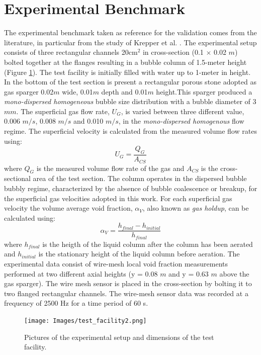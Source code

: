 \documentclass[11pt,a4paper]{article}
\begin{document}
\section{Experimental Benchmark}
\label{sec:expbench}
The  experimental benchmark taken as reference for the validation comes from the literature, in particular from the study of Krepper et al. \cite{krepper}. The experimental setup consists of three rectangular channels 20cm$^2$ in cross-section (0.1 $\times$ 0.02 $m$) bolted together at the flanges resulting in a bubble column of 1.5-meter height (Figure \ref{fig:facility}). The test facility is initially filled with water up to 1-meter in height. In the bottom of the test section is present a rectangular porous stone adopted as gas sparger 0.02$m$ wide, 0.01$m$ depth and 0.01$m$ height.This sparger produced a \textit{mono-dispersed homogeneous} bubble size distribution with a bubble diameter of 3 $mm$. The superficial gas flow rate, $U_G$, is varied between three different value, 0.006 $m/s$, 0.008 $m/s$ and 0.010 $m/s$, in the \textit{mono-dispersed homogenous} flow regime. The superficial velocity is calculated from the measured volume flow rates using: 
\begin{equation}
    U_G=\frac{Q_G}{A_{CS}}
\end{equation}
where $Q_G$ is the measured volume flow rate of the gas and $A_{CS}$ is the cross-sectional area of the test section. The column operates in the dispersed bubble bubbly regime, characterized by the absence of bubble coalescence or breakup, for the superficial gas velocities adopted in this work. For each superficial gas velocity the volume average void fraction, $\alpha_V$, also known as \textit{gas holdup}, can be calculated using: 
\begin{equation}
    \alpha_V=\frac{h_{final}-h_{initial}}{h_{final}}
\end{equation}
where $h_{final}$ is the heigth of the liquid column after the column has been aerated and $h_{initial}$ is the stationary height of the liquid column before aeration. The experimental data consist of wire-mesh local void fraction measurements performed at two different axial heights (y = 0.08 $m$ and y = 0.63 $m$ above the gas sparger). The wire mesh sensor is placed in the cross-section by bolting it to two flanged rectangular channels. The wire-mesh sensor data was recorded at a frequency of 2500 Hz for a time period of 60 s. 
\clearpage
\begin{figure}[!ht]
	\centering
	\texttt{[image: Images/test\_facility2.png]}
	\caption{Pictures of the experimental setup and dimensions of the  test facility.}
	\label{fig:facility}
\end{figure}
\end{document}
